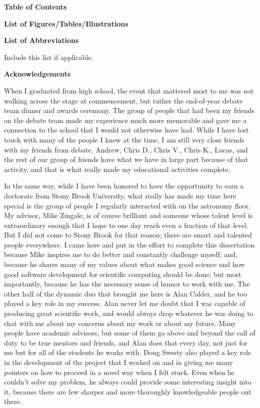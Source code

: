 \documentclass[12pt]{article}
\begin{document}
\newpage
\centerline{\bf{Table of Contents}}
\renewcommand*\contentsname{}
\tableofcontents

\newpage
\centerline{\bf{List of Figures/Tables/Illustrations}}
\vspace*{4\baselineskip}

\listoffigures

\listoftables

\newpage
\centerline{\bf{List of Abbreviations}}
\vspace*{4\baselineskip}
Include this list if applicable.

\newpage
\centerline{\bf{Acknowledgements}}
\vspace*{4\baselineskip}
When I graduated from high school, the event that mattered most to me was 
not walking across the stage at commencement, but rather the end-of-year 
debate team dinner and awards ceremony. The group of people that had been
my friends on the debate team made my experience much more memorable and 
gave me a connection to the school that I would not otherwise have had.
While I have lost touch with many of the people I knew at the time, I am 
still very close friends with my friends from debate. Andrew, Chris D.,
Chris V., Chris K., Lucas, and the rest of our group of friends have 
what we have in large part because of that activity, and that is what 
really made my educational activities complete.

In the same way, while I have been honored to have the opportunity to 
earn a doctorate from Stony Brook University, what really has made my 
time here special is the group of people I regularly interacted with 
on the astronomy floor. My advisor, Mike Zingale, is of course brilliant 
and someone whose talent level is extraordinary enough that I hope to 
one day reach even a fraction of that level. But I did not come to Stony 
Brook for that reason; there are smart and talented people everywhere. 
I came here and put in the effort to complete this dissertation because 
Mike inspires me to do better and constantly challenge myself;
and, because he shares many of my values about what makes good science and 
how good software development for scientific computing should be done;
but most importantly, because he has the necessary sense of humor to work 
with me. The other half of the dynamic duo that brought me here is Alan 
Calder, and he too played a key role in my success. Alan never let me 
doubt that I was capable of producing great scientific work, and would 
always drop whatever he was doing to chat with me about my concerns about 
my work or about my future. Many people have academic advisors, but some 
of them go above and beyond the call of duty to be true mentors and friends,
and Alan does that every day, not just for me but for all of the students 
he works with. Doug Swesty also played a key role in the development of the 
project that I worked on and in giving me many pointers on how to proceed 
in a novel way when I felt stuck. Even when he couldn't solve my problem, 
he always could provide some interesting insight into it, because there 
are few sharper and more thoroughly knowledgeable people out there.
\end{document}
